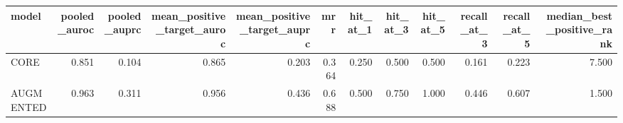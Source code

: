 \begin{tabular}{lrrrrrrrrrrr}
\toprule
model & pooled_auroc & pooled_auprc & mean_positive_target_auroc & mean_positive_target_auprc & mrr & hit_at_1 & hit_at_3 & hit_at_5 & recall_at_3 & recall_at_5 & median_best_positive_rank \\
\midrule
CORE & 0.851 & 0.104 & 0.865 & 0.203 & 0.364 & 0.250 & 0.500 & 0.500 & 0.161 & 0.223 & 7.500 \\
AUGMENTED & 0.963 & 0.311 & 0.956 & 0.436 & 0.688 & 0.500 & 0.750 & 1.000 & 0.446 & 0.607 & 1.500 \\
\bottomrule
\end{tabular}
